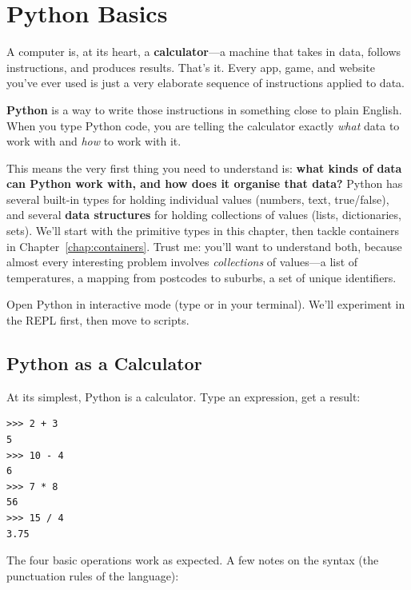 
\chapter{Python Basics}
\label{chap:basics}

A computer is, at its heart, a \textbf{calculator}---a machine that takes in data, follows instructions, and produces results. That's it. Every app, game, and website you've ever used is just a very elaborate sequence of instructions applied to data.

\textbf{Python} is a way to write those instructions in something close to plain English. When you type Python code, you are telling the calculator exactly \textit{what} data to work with and \textit{how} to work with it.

This means the very first thing you need to understand is: \textbf{what kinds of data can Python work with, and how does it organise that data?} Python has several built-in types for holding individual values (numbers, text, true/false), and several \textbf{data structures} for holding collections of values (lists, dictionaries, sets). We'll start with the primitive types in this chapter, then tackle containers in Chapter~\ref{chap:containers}. Trust me: you'll want to understand both, because almost every interesting problem involves \textit{collections} of values---a list of temperatures, a mapping from postcodes to suburbs, a set of unique identifiers.

Open Python in interactive mode (type  or  in your terminal). We'll experiment in the REPL first, then move to scripts.

\section{Python as a Calculator}
\label{sec:calculator}

At its simplest, Python is a calculator. Type an expression, get a result:

\begin{lstlisting}
>>> 2 + 3
5
>>> 10 - 4
6
>>> 7 * 8
56
>>> 15 / 4
3.75
\end{lstlisting}

The four basic operations work as expected. A few notes on the syntax (the punctuation rules of the language):

